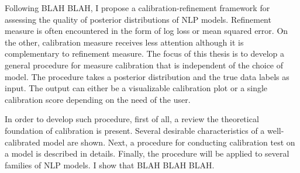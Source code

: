 Following BLAH BLAH, I propose a calibration-refinement framework for assessing the quality of posterior distributions of NLP models. Refinement measure is often encountered in the form of log loss or mean squared error. On the other, calibration measure receives less attention although it is complementary to refinement measure. The focus of this thesis is to develop a general procedure for measure calibration that is independent of the choice of model. The procedure takes a posterior distribution and the true data labels as input. The output can either be a visualizable calibration plot or a single calibration score depending on the need of the user. 

In order to develop such procedure, first of all, a review the theoretical foundation of calibration is present. Several desirable characteristics of a well-calibrated model are shown. Next, a procedure for conducting calibration test on a model is described in details. Finally, the procedure will be applied to several families of NLP models. I show that BLAH BLAH BLAH.
